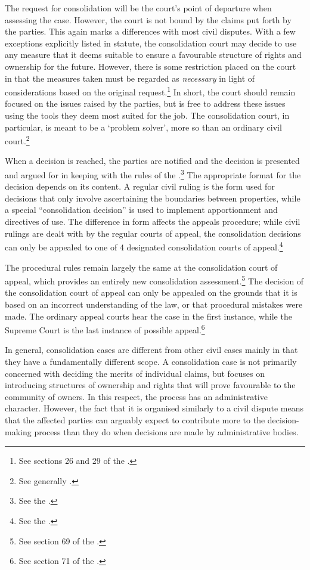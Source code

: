{The request for consolidation will be the court's point of departure when assessing the case. However, the court is not bound by the claims put forth by the parties. This again marks a differences with most civil disputes. With a few exceptions explicitly listed in statute, the consolidation court may decide to use any measure that it deems suitable to ensure a favourable structure of rights and ownership for the future. However, there is some restriction placed on the court in that the measures taken must be regarded as \emph{necessary} in light of considerations based on the original request.\footnote{See sections 26 and 29 of the \cite{lca79}.} In short, the court should remain focused on the issues raised by the parties, but is free to address these issues using the tools they deem most suited for the job. The consolidation court, in particular, is meant to be a `problem solver', more so than an ordinary civil court.\footnote{See generally \cite{rognes07}.}

When a decision is reached, the parties are notified and the decision is presented and argued for in keeping with the rules of the \cite{cda05}.\footnote{See the \dni\cite[7|22]{lca79}.} The appropriate format for the decision depends on its content. A regular civil ruling is the form used for decisions that only involve ascertaining the boundaries between properties, while a special ``consolidation decision'' is used to implement apportionment and directives of use. The difference in form affects the appeals procedure; while civil rulings are dealt with by the regular courts of appeal, the consolidation decisions can only be appealed to one of 4 designated consolidation courts of appeal.\footnote{See the \dni\cite[61]{lca79}.}

The procedural rules remain largely the same at the consolidation court of appeal, which provides an entirely new consolidation assessment.\footnote{See section 69 of the \cite{lca79}.} The decision of the consolidation court of appeal can only be appealed on the grounds that it is based on an incorrect understanding of the law, or that procedural mistakes were made. The ordinary appeal courts hear the case in the first instance, while the Supreme Court is the last instance of possible appeal.\footnote{See section 71 of the \cite{lca79}.}

In general, consolidation cases are different from other civil cases mainly in that they have a fundamentally different scope. A consolidation case is not primarily concerned with deciding the merits of individual claims, but focuses on introducing structures of ownership and rights that will prove favourable to the community of owners. In this respect, the process has an administrative character. However, the fact that it is organised similarly to a civil dispute means that the affected parties can arguably expect to contribute more to the decision-making process than they do when decisions are made by administrative bodies.

}
